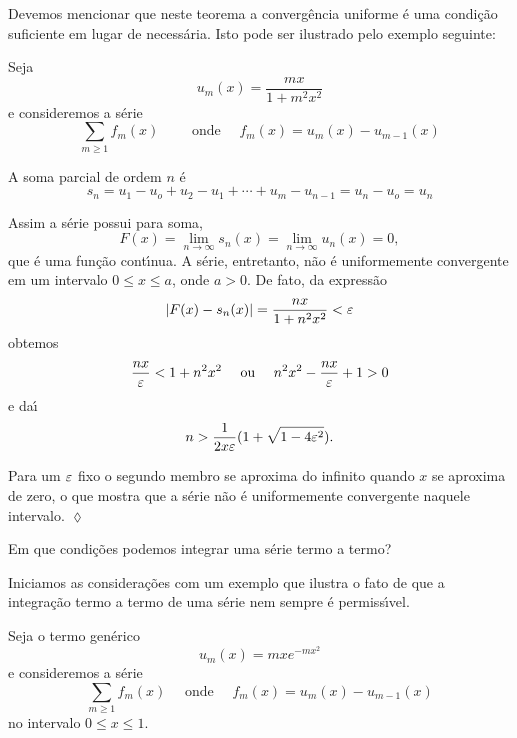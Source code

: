 Devemos mencionar que neste teorema a converg\^{e}ncia uniforme \'{e} uma
condi\c{c}\~{a}o suficiente em lugar de necess\'{a}ria. Isto pode ser
ilustrado pelo exemplo seguinte:


\begin{exer}\label{ex144:5}
Seja
\begin{equation*}
u_m(x)=\frac{mx}{1+m^2x^2}
\end{equation*}
e consideremos a s\'{e}rie
\begin{equation*}
\sum_{m\geq 1}f_m(x) \qquad \text{ onde }\quad f_m(x) = u_m(x) -
u_{m-1}(x)
\end{equation*}
\end{exer}

\solo A soma parcial de ordem $n$ \'{e}
\begin{equation*}
s_n=u_1-u_o+u_2-u_1+\cdots+u_m-u_{n-1}=u_n-u_o=u_n
\end{equation*}

Assim a s\'{e}rie possui para soma,
\begin{equation*}
F(x) = \lim_{n\to \infty}s_n(x) = \lim_{n\to\infty}u_n(x) = 0,
\end{equation*}
que \'{e} uma fun\c{c}\~{a}o cont\'{\i}nua. A s\'{e}rie, entretanto, n\~{a}o \'{e}
uniformemente convergente em um intervalo $0 \le x \le a$, onde $a
> 0$. De fato, da express\~{a}o
\begin{equation*}
|F(x)-s_n(x)|=\frac{nx}{1+n^2x^2}<\varepsilon
\end{equation*}
obtemos
\begin{equation*}
\frac{nx}{\varepsilon} < 1 + n^2x^2 \quad \text{ ou }\quad  n^2x^2
-\frac{nx}{\varepsilon}+1>0
\end{equation*}
e da\'{\i}
\begin{equation*}
n > \frac{1}{2x\varepsilon}(1 + \sqrt{1-4\varepsilon^2}).
\end{equation*}

Para um $\varepsilon$ fixo o segundo membro se aproxima do infinito
quando $x$ se aproxima de zero, o que mostra que a s\'{e}rie n\~{a}o \'{e}
uniformemente convergente naquele intervalo. \hfill \(\lozenge\)

Em que condi\c{c}\~{o}es podemos integrar uma s\'{e}rie termo a termo?

Iniciamos as considera\c{c}\~{o}es com um exemplo que ilustra o fato de
que a integra\c{c}\~{a}o termo a termo de uma s\'{e}rie nem sempre \'{e}
permiss\'{\i}vel.

\begin{exer}\label{ex144:6}
Seja o termo gen\'{e}rico
\begin{equation*}
u_m(x) = mxe^{-mx^2}
\end{equation*}
e consideremos a s\'{e}rie
\begin{equation}\label{gene}
\sum_{m\geq 1}f_m(x)\quad \text{ onde }\quad f_m(x) = u_m(x) -
u_{m-1}(x)
\end{equation}
no intervalo $0 \le x \le 1$.
\end{exer}

